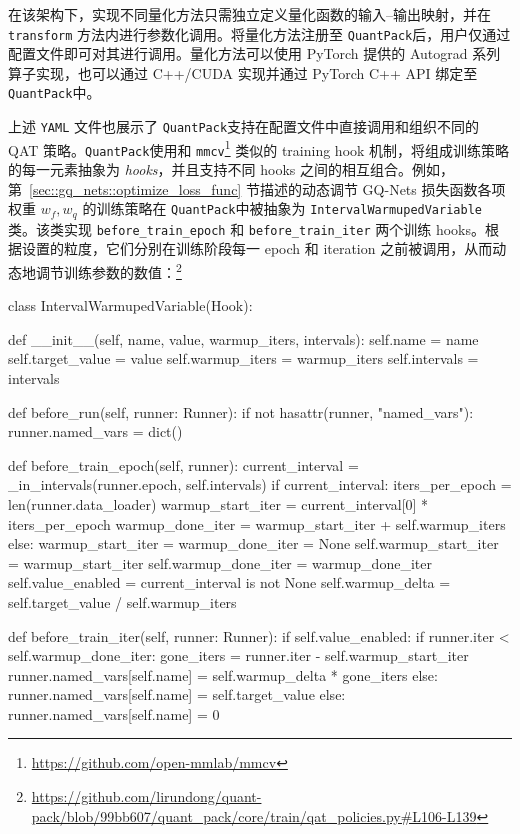 \documentclass[
]{shtthesis}
\providecommand{\QP}{\texttt{QuantPack}}
\begin{document}
在该架构下，实现不同量化方法只需独立定义量化函数的输入--输出映射，并在 \verb|transform| 方法内进行参数化调用。将量化方法注册至 \QP 后，用户仅通过配置文件即可对其进行调用。量化方法可以使用 PyTorch 提供的 Autograd 系列算子实现，也可以通过 C++/CUDA 实现并通过 PyTorch C++ API 绑定至 \QP 中。

上述 \verb|YAML| 文件也展示了 \QP 支持在配置文件中直接调用和组织不同的 QAT 策略。\QP 使用和 \verb|mmcv|\footnote{\url{https://github.com/open-mmlab/mmcv}} 类似的 training hook 机制，将组成训练策略的每一元素抽象为 \emph{hooks}，并且支持不同 hooks 之间的相互组合。例如，第~\ref{sec::gq_nets::optimize_loss_func} 节描述的动态调节 GQ-Nets 损失函数各项权重 $w_f, w_q$ 的训练策略在 \QP 中被抽象为 \verb|IntervalWarmupedVariable| 类。该类实现 \verb|before_train_epoch| 和 \verb|before_train_iter| 两个训练 hooks。根据设置的粒度，它们分别在训练阶段每一 epoch 和 iteration 之前被调用，从而动态地调节训练参数的数值：\footnote{\url{https://github.com/lirundong/quant-pack/blob/99bb607/quant_pack/core/train/qat_policies.py\#L106-L139}}
\begin{python}
class IntervalWarmupedVariable(Hook):

    def __init__(self, name, value, warmup_iters, intervals):
        self.name = name
        self.target_value = value
        self.warmup_iters = warmup_iters
        self.intervals = intervals

    def before_run(self, runner: Runner):
        if not hasattr(runner, "named_vars"):
            runner.named_vars = dict()

    def before_train_epoch(self, runner):
        current_interval = _in_intervals(runner.epoch, self.intervals)
        if current_interval:
            iters_per_epoch = len(runner.data_loader)
            warmup_start_iter = current_interval[0] * iters_per_epoch
            warmup_done_iter = warmup_start_iter + self.warmup_iters
        else:
            warmup_start_iter = warmup_done_iter = None
        self.warmup_start_iter = warmup_start_iter
        self.warmup_done_iter = warmup_done_iter
        self.value_enabled = current_interval is not None
        self.warmup_delta = self.target_value / self.warmup_iters

    def before_train_iter(self, runner: Runner):
        if self.value_enabled:
            if runner.iter < self.warmup_done_iter:
                gone_iters = runner.iter - self.warmup_start_iter
                runner.named_vars[self.name] = self.warmup_delta * gone_iters
            else:
                runner.named_vars[self.name] = self.target_value
        else:
            runner.named_vars[self.name] = 0
\end{python}
\end{document}
